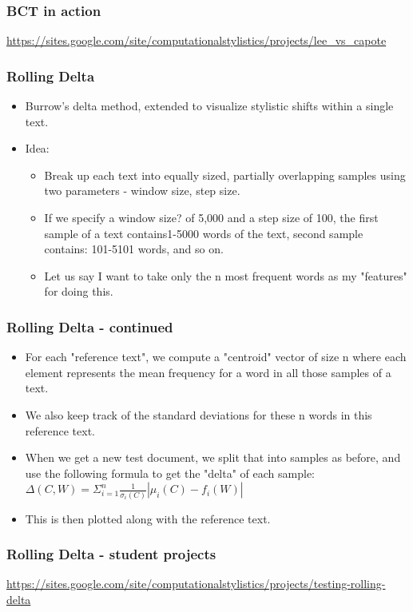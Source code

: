 \documentclass{beamer}
\begin{document}
\begin{frame}
\frametitle{BCT in action}
\small
\url{https://sites.google.com/site/computationalstylistics/projects/lee_vs_capote}
\end{frame}



\begin{frame}
\frametitle{Rolling Delta}
\begin{itemize}
\item Burrow's delta method, extended to visualize stylistic shifts within a single text. \pause
\item Idea:
\begin{itemize}	
\item Break up each text into equally sized, partially overlapping samples using two parameters - window size, step size.
\item If  we  specify  a window  size? of  5,000  and  a  step  size  of  100, the  first  sample  of  a  text  contains1-5000 words of the text, second sample contains: 101-5101 words, and so on. 
\item Let us say I want to take only the n most frequent words as my "features" for doing this.
\end{itemize}
\end{itemize}
\end{frame}

\begin{frame}
\frametitle{Rolling Delta - continued}
\begin{itemize}
\item For each "reference text", we compute a "centroid" vector of size n where each element represents the mean frequency for a word in all those samples of a text.
\item We also keep track of the standard deviations for these n words in this reference text.
\item When we get a new test document, we split that into samples as before, and use the following formula to get the "delta" of each sample:
\\ $\Delta(C,W) = \Sigma_{i=1}^n \frac{1}{\sigma_i (C)} |\mu_i(C)-f_i(W)|$
\item This is then plotted along with the reference text.
\end{itemize}
\end{frame}

\begin{frame}
\frametitle{Rolling Delta - student projects}
\small
\url{https://sites.google.com/site/computationalstylistics/projects/testing-rolling-delta}
\end{frame}
\end{document}
